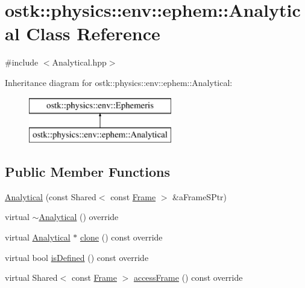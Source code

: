 \hypertarget{classostk_1_1physics_1_1env_1_1ephem_1_1_analytical}{}\section{ostk\+:\+:physics\+:\+:env\+:\+:ephem\+:\+:Analytical Class Reference}
\label{classostk_1_1physics_1_1env_1_1ephem_1_1_analytical}


{\ttfamily \#include $<$Analytical.\+hpp$>$}

Inheritance diagram for ostk\+:\+:physics\+:\+:env\+:\+:ephem\+:\+:Analytical\+:\begin{figure}[H]
\begin{center}
\leavevmode
\includegraphics[height=2.000000cm]{classostk_1_1physics_1_1env_1_1ephem_1_1_analytical}
\end{center}
\end{figure}
\subsection*{Public Member Functions}
\begin{DoxyCompactItemize}
\item 
\hyperlink{classostk_1_1physics_1_1env_1_1ephem_1_1_analytical_a43cc9bb39be92ff42241c663e443ced3}{Analytical} (const Shared$<$ const \hyperlink{classostk_1_1physics_1_1coord_1_1_frame}{Frame} $>$ \&a\+Frame\+S\+Ptr)
\item 
virtual \hyperlink{classostk_1_1physics_1_1env_1_1ephem_1_1_analytical_a404523e0ada105dbf4bf54b3c1c91e05}{$\sim$\+Analytical} () override
\item 
virtual \hyperlink{classostk_1_1physics_1_1env_1_1ephem_1_1_analytical}{Analytical} $\ast$ \hyperlink{classostk_1_1physics_1_1env_1_1ephem_1_1_analytical_aeb01e31d1fd2d142efa5815ff3a44ea4}{clone} () const override
\item 
virtual bool \hyperlink{classostk_1_1physics_1_1env_1_1ephem_1_1_analytical_ac832a4552abfbeba38891cb936bc15ef}{is\+Defined} () const override
\item 
virtual Shared$<$ const \hyperlink{classostk_1_1physics_1_1coord_1_1_frame}{Frame} $>$ \hyperlink{classostk_1_1physics_1_1env_1_1ephem_1_1_analytical_a380712abe920ca25b2a3526d4a776033}{access\+Frame} () const override
\end{DoxyCompactItemize}


